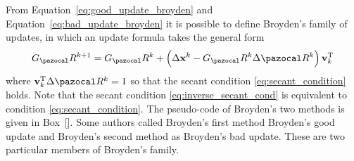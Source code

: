 From Equation~\eqref{eq:good_update_broyden} and Equation~\eqref{eq:bad_update_broyden} it is possible to define Broyden's family of updates, in which an update formula takes the general form
\begin{equation}
G_\pazocal R^{k+1}=G_\pazocal R^{k}+\left(\Delta \mathbf x^{k}-G_\pazocal R^{k} \Delta \pazocal R^{k}\right) \mathbf v_{k}^{\mathrm{T}}
\end{equation}
where \(\mathbf v_{k}^{\mathrm{T}} \Delta \pazocal R^{k}=1\) so that the secant condition \eqref{eq:secant_condition} holds.
Note that the secant condition \eqref{eq:inverse_secant_cond} is equivalent to condition \eqref{eq:secant_condition}.
The pseudo-code of Broyden's two methods is given in Box~\ref{}.
Some authors called Broyden's first method Broyden's good update and Broyden's second method as Broyden's bad update.
These are two particular members of Broyden's family.

